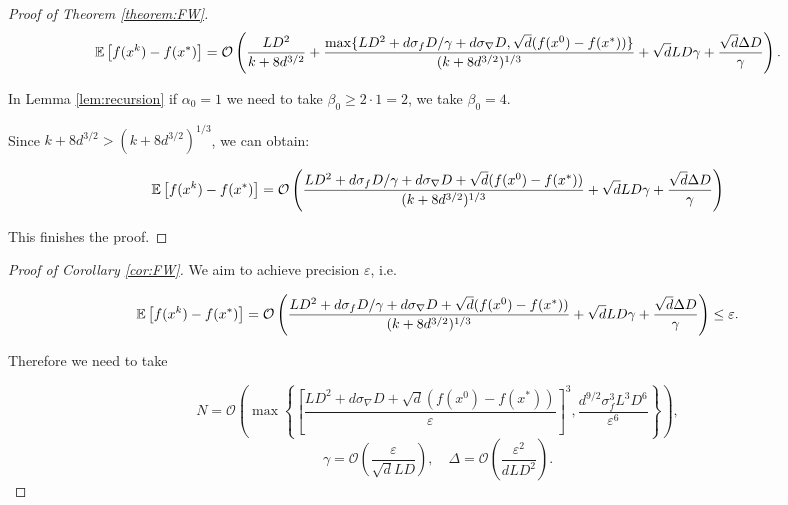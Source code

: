 \begin{proof}[Proof of Theorem \ref{theorem:FW}]
        \begin{equation*}
            \mathbb{E}\left[ f(x^{k}) - f(x^*) \right] 
            =
            \mathcal{O} \left( \frac{L D^2}{k + 8d^{3/2}} + \frac{\max\{L D^2 + d \sigma_f D/ \gamma + d\sigma_{\nabla} D, \sqrt{d} (f(x^0) - f(x^*))\}}{(k + 8d^{3/2})^{1/3}} 
            + \sqrt{d} L D \gamma + \frac{\sqrt{d} \Delta D}{\gamma}\right).
        \end{equation*}

        In Lemma \ref{lem:recursion} if $\alpha_0 = 1$ we need to take $\beta_0 \geq 2 \cdot 1 = 2$, we take $\beta_0 = 4$.

        Since $k + 8d^{3/2} > (k + 8d^{3/2})^{1/3}$, we can obtain:

        \begin{equation*}
            \mathbb{E}\left[ f(x^{k}) - f(x^*) \right] 
            =
            \mathcal{O} \left( \frac{L D^2 + d \sigma_f D/ \gamma + d\sigma_{\nabla} D + \sqrt{d} (f(x^0) - f(x^*))}{(k + 8d^{3/2})^{1/3}} 
            + \sqrt{d} L D \gamma + \frac{\sqrt{d} \Delta D}{\gamma}\right)
        \end{equation*}
        
        This finishes the proof.
    
    \end{proof}

    \begin{proof}[Proof of Corollary \ref{cor:FW}]
        We aim to achieve precision $\varepsilon$, i.e.

        \begin{equation*}
            \mathbb{E}\left[ f(x^{k}) - f(x^*) \right] 
            =
            \mathcal{O} \left( \frac{L D^2 + d \sigma_f D/ \gamma + d\sigma_{\nabla} D + \sqrt{d} (f(x^0) - f(x^*))}{(k + 8d^{3/2})^{1/3}} 
            + \sqrt{d} L D \gamma + \frac{\sqrt{d} \Delta D}{\gamma}\right)
            \leq \varepsilon.
        \end{equation*}

        Therefore we need to take

        \begin{equation*}
                N = \mathcal{O} \left( \max\left\{ \left[ \frac{L D^2 + d\sigma_{\nabla} D + \sqrt{d} (f(x^0) - f(x^*))}{\varepsilon}\right]^3 , \frac{d^{9/2} \sigma_f^3 L^3D^6}{\varepsilon^6} \right\}\right),
            \end{equation*}
        \begin{equation*}
            \gamma = \mathcal{O} \left(\frac{\varepsilon}{\sqrt{d} L D} \right), \quad
            \Delta = \mathcal{O} \left( \frac{\varepsilon^2}{d L D^2}\right).
        \end{equation*}
        
        
    \end{proof}